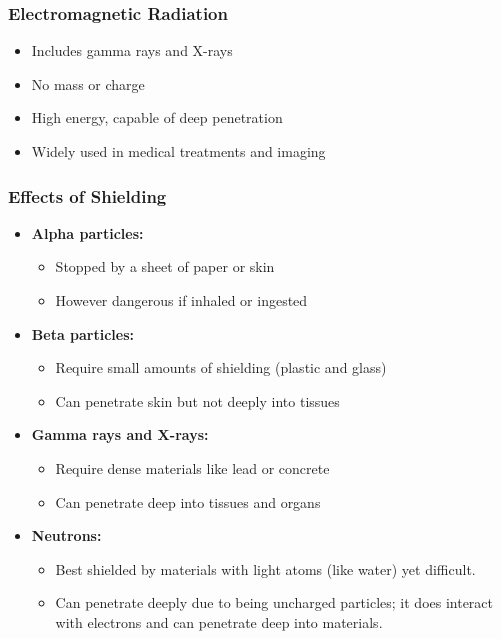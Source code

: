 \documentclass[aspectratio=169]{beamer}
\begin{document}
\begin{frame}
\frametitle{Electromagnetic Radiation}
\begin{itemize}
    \item Includes gamma rays and X-rays
    \item No mass or charge
    \item High energy, capable of deep penetration
    \item Widely used in medical treatments and imaging
\end{itemize}
\end{frame}

\begin{frame}
\frametitle{Effects of Shielding}
\begin{itemize}
    \item \textbf{Alpha particles:}
    \begin{itemize}
        \item Stopped by a sheet of paper or skin
        \item However dangerous if inhaled or ingested
    \end{itemize}
    \item \textbf{Beta particles:}
    \begin{itemize}
        \item Require small amounts of shielding (plastic and glass)
        \item Can penetrate skin but not deeply into tissues
    \end{itemize}
    \item \textbf{Gamma rays and X-rays:}
    \begin{itemize}
        \item Require dense materials like lead or concrete
        \item Can penetrate deep into tissues and organs
    \end{itemize}
    \item \textbf{Neutrons:}
    \begin{itemize}
        \item Best shielded by materials with light atoms (like water) yet difficult.
        \item Can penetrate deeply due to being uncharged particles; it does interact with electrons and can penetrate deep into materials. 
    \end{itemize}
\end{itemize}
\end{frame}
\end{document}
